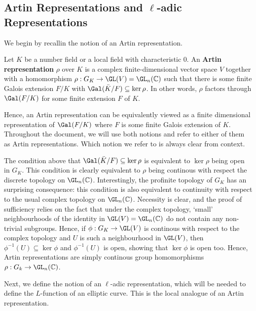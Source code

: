 \subsection{Artin Representations and  \texorpdfstring{$\ell$}{TEXT}-adic Representations} \label{subsection_reps}

We begin by recallin the notion of an Artin representation.

\begin{defn}
    Let $K$ be a number field or a local field with characteristic $0$. An \textbf{Artin representation} $\rho$ over $K$ is a complex finite-dimensional vector space $V$ together with a homomorphism $\rho:G_K\to\GL(V)=\GL_n(\CC)$ such that there is some finite Galois extension $F/K$ with $\Gal(\bar{K}/F)\subseteq\ker\rho$. In other words, $\rho$ factors through $\Gal(F/K)$ for some finite extension $F$ of $K$.
\end{defn}

Hence, an Artin representation can be equivalently viewed as a finite dimensional representation of $\Gal(F/K)$ where $F$ is some finite Galois extension of $K$. Throughout the document, we will use both notions and refer to either of them as Artin representations. Which notion we refer to is always clear from context.

\begin{rem}
    The condition above that $\Gal(\bar{K}/F)\subseteq\ker\rho$ is equivalent to $\ker\rho$ being open in $G_K$. This condition is clearly equivalent to $\rho$ being continous with respect the discrete topology on $\GL_n(\CC)$. Interestingly, the profinite topology of $G_K$ has an surprising consequence: this condition is also equivalent to continuity with respect to the usual complex topology on $\GL_n(\CC)$. Necessity is clear, and the proof of sufficiency relies on the fact that under the complex topology, `small' neighbourhoods of the identity in $\GL(V)=\GL_n(\CC)$ do not contain any non-trivial subgroups. Hence, if $\phi:G_K\to\GL(V)$ is continous with respect to the complex topology and $U$ is such a neighbourhood in $\GL(V)$, then $\phi^{-1}(U)\subseteq\ker\phi$ and $\phi^{-1}(U)$ is open, showing that $\ker\phi$ is open too. Hence, Artin representations are simply continous group homomorphisms $\rho:G_k\to\GL_n(\CC)$.
\end{rem}

Next, we define the notion of an $\ell$-adic representation, which will be needed to define the $L$-function of an elliptic curve. This is the local analogue of an Artin representation.

